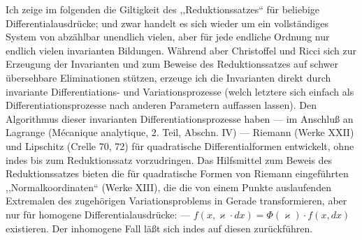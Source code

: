 Ich zeige im folgenden die Giltigkeit des ,,Reduktionssatzes`` für
beliebige Differentialausdrücke; und zwar handelt es sich wieder um
ein vollständiges System von abzählbar unendlich vielen, aber für jede
endliche Ordnung nur endlich vielen invarianten Bildungen. Während
aber Christoffel und Ricci sich zur Erzeugung der Invarianten und zum
Beweise des Reduktionssatzes auf schwer übersehbare Eliminationen
stützen, erzeuge ich die Invarianten direkt durch invariante
Differentiations- und Variationsprozesse (welch letztere sich einfach
als Differentiationsprozesse nach anderen Parametern auffassen lassen).
Den Algorithmus dieser invarianten Differentiationsprozesse haben ---
im Anschluß an Lagrange (Mécanique analytique, 2. Teil, Abschn. IV)
--- Riemann (Werke XXII) und Lipschitz (Crelle 70, 72) für
quadratische Differentialformen entwickelt, ohne indes bis zum
Reduktionssatz vorzudringen. Das Hilfsmittel zum Beweis des
Reduktionssatzes bieten die für quadratische Formen von Riemann
eingeführten ,,Normalkoordinaten`` (Werke XIII), die die von einem
Punkte auslaufenden Extremalen des zugehörigen Variationsproblems in
Gerade transformieren, aber nur für homogene Differentialausdrücke:
--- \(f(x,\varkappa\cdot dx)=\Phi(\varkappa)\cdot f(x,dx)\) existieren. Der
inhomogene Fall läßt sich indes auf diesen zurückführen.

